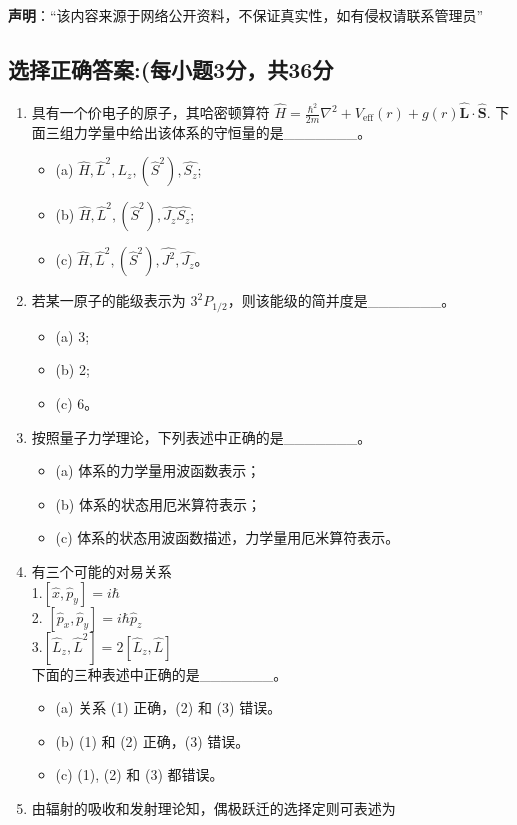 
\textbf{声明}：“该内容来源于网络公开资料，不保证真实性，如有侵权请联系管理员”

\subsection{选择正确答案:(每小题3分，共36分}
\begin{enumerate}
\item  具有一个价电子的原子，其哈密顿算符 $\hat{H} = \frac{\hbar^2}{2m} \nabla^2 + V_{\text{eff}}(r) + g(r) \mathbf{\hat L} \cdot \mathbf{\hat S}$. 下面三组力学量中给出该体系的守恒量的是_______。
    \begin{itemize}
        \item (a) $\hat{H}, \hat{L}^2, L_z, (\hat{S}^2), \hat{S_z}$;
        \item (b) $\hat{H}, \hat{L}^2, (\hat{S}^2), \hat{J_z}\hat{S_z}$;
        \item (c) $\hat{H}, \hat{L}^2, (\hat{S}^2), \hat{J^2},\hat{J_z}$。
    \end{itemize}
\item  若某一原子的能级表示为 $3^2P_{1/2}$，则该能级的简并度是_______。
 \begin{itemize}
        \item (a) 3;
        \item (b) 2;
        \item (c) 6。
    \end{itemize}
    \item 按照量子力学理论，下列表述中正确的是_______。
    \begin{itemize}
        \item (a) 体系的力学量用波函数表示；
        \item (b) 体系的状态用厄米算符表示；
        \item (c) 体系的状态用波函数描述，力学量用厄米算符表示。
    \end{itemize}
     \item 有三个可能的对易关系\\
     1.$[\hat{x}, \hat{p}_y] = i \hbar$\\
     2. $[\hat{p}_x, \hat{p}_y] = i \hbar \hat{p}_z$\\
     3.$[\hat{L}_z, \hat{L}^2] = 2[\hat{L}_z, \hat{L}]$\\
     下面的三种表述中正确的是_______。
     \begin{itemize}
        \item (a) 关系 (1) 正确，(2) 和 (3) 错误。
        \item (b) (1) 和 (2) 正确，(3) 错误。
        \item (c) (1), (2) 和 (3) 都错误。
    \end{itemize}
    \item 由辐射的吸收和发射理论知，偶极跃迁的选择定则可表述为
\end{enumerate}

